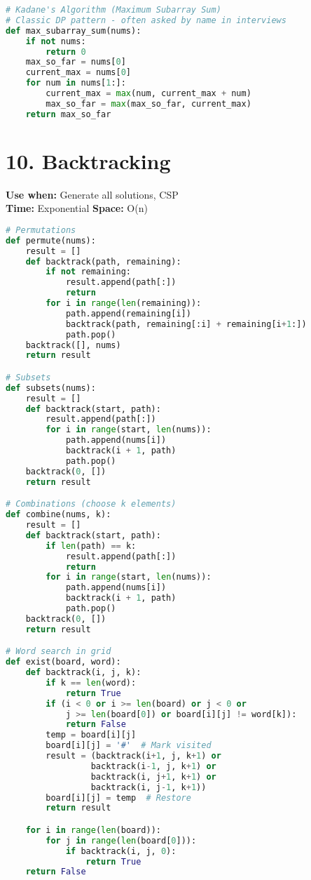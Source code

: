 \documentclass[8pt,landscape]{article}
\begin{document}
\begin{multicols}{3}
\begin{lstlisting}[language=Python]
# Kadane's Algorithm (Maximum Subarray Sum)
# Classic DP pattern - often asked by name in interviews
def max_subarray_sum(nums):
    if not nums:
        return 0
    max_so_far = nums[0]
    current_max = nums[0]
    for num in nums[1:]:
        current_max = max(num, current_max + num)
        max_so_far = max(max_so_far, current_max)
    return max_so_far
\end{lstlisting}

\section*{10. Backtracking}
\textbf{Use when:} Generate all solutions, CSP \\
\textbf{Time:} Exponential \quad \textbf{Space:} O(n)
\begin{lstlisting}[language=Python]
# Permutations
def permute(nums):
    result = []
    def backtrack(path, remaining):
        if not remaining:
            result.append(path[:])
            return
        for i in range(len(remaining)):
            path.append(remaining[i])
            backtrack(path, remaining[:i] + remaining[i+1:])
            path.pop()
    backtrack([], nums)
    return result

# Subsets
def subsets(nums):
    result = []
    def backtrack(start, path):
        result.append(path[:])
        for i in range(start, len(nums)):
            path.append(nums[i])
            backtrack(i + 1, path)
            path.pop()
    backtrack(0, [])
    return result

# Combinations (choose k elements)
def combine(nums, k):
    result = []
    def backtrack(start, path):
        if len(path) == k:
            result.append(path[:])
            return
        for i in range(start, len(nums)):
            path.append(nums[i])
            backtrack(i + 1, path)
            path.pop()
    backtrack(0, [])
    return result

# Word search in grid
def exist(board, word):
    def backtrack(i, j, k):
        if k == len(word):
            return True
        if (i < 0 or i >= len(board) or j < 0 or
            j >= len(board[0]) or board[i][j] != word[k]):
            return False
        temp = board[i][j]
        board[i][j] = '#'  # Mark visited
        result = (backtrack(i+1, j, k+1) or
                 backtrack(i-1, j, k+1) or
                 backtrack(i, j+1, k+1) or
                 backtrack(i, j-1, k+1))
        board[i][j] = temp  # Restore
        return result

    for i in range(len(board)):
        for j in range(len(board[0])):
            if backtrack(i, j, 0):
                return True
    return False
\end{lstlisting}


\end{multicols}
\end{document}
